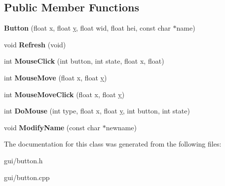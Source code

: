 \subsection*{Public Member Functions}
\begin{DoxyCompactItemize}
\item 
{\bfseries Button} (float x, float \hyperlink{IceUtils_8h_aa7ffaed69623192258fb8679569ff9ba}{y}, float wid, float hei, const char $\ast$name)\hypertarget{classButton_ab361aed01fd778c5ff7fce686c69ef6b}{}\label{classButton_ab361aed01fd778c5ff7fce686c69ef6b}

\item 
void {\bfseries Refresh} (void)\hypertarget{classButton_a0c10b2a274f6465f96ced81b307050f2}{}\label{classButton_a0c10b2a274f6465f96ced81b307050f2}

\item 
int {\bfseries Mouse\+Click} (int button, int state, float x, float)\hypertarget{classButton_ae44df34635570bbaf1f8a0fe49df6ddb}{}\label{classButton_ae44df34635570bbaf1f8a0fe49df6ddb}

\item 
int {\bfseries Mouse\+Move} (float x, float \hyperlink{IceUtils_8h_aa7ffaed69623192258fb8679569ff9ba}{y})\hypertarget{classButton_a65353fb9ceeb9d0637246682ae90dae1}{}\label{classButton_a65353fb9ceeb9d0637246682ae90dae1}

\item 
int {\bfseries Mouse\+Move\+Click} (float x, float \hyperlink{IceUtils_8h_aa7ffaed69623192258fb8679569ff9ba}{y})\hypertarget{classButton_a7a0e2c58c7b71bf2ed6a0e7e145c2f04}{}\label{classButton_a7a0e2c58c7b71bf2ed6a0e7e145c2f04}

\item 
int {\bfseries Do\+Mouse} (int type, float x, float \hyperlink{IceUtils_8h_aa7ffaed69623192258fb8679569ff9ba}{y}, int button, int state)\hypertarget{classButton_ac467a26007f4476414185e8a34f66ab1}{}\label{classButton_ac467a26007f4476414185e8a34f66ab1}

\item 
void {\bfseries Modify\+Name} (const char $\ast$newname)\hypertarget{classButton_a2b6685678345d0fd4bb8a1877e66f65d}{}\label{classButton_a2b6685678345d0fd4bb8a1877e66f65d}

\end{DoxyCompactItemize}


The documentation for this class was generated from the following files\+:\begin{DoxyCompactItemize}
\item 
gui/button.\+h\item 
gui/button.\+cpp\end{DoxyCompactItemize}
